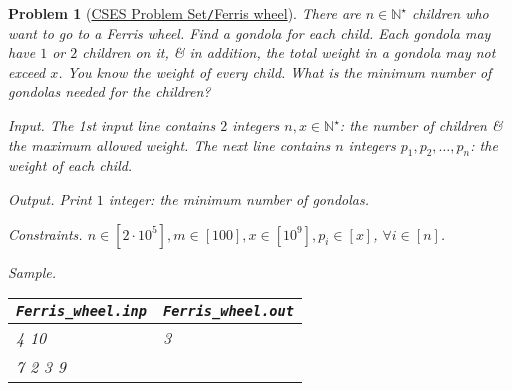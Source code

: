 \documentclass{article}
\newtheorem{problem}{Problem}
\begin{document}
\begin{problem}[\href{https://cses.fi/problemset/task/1090}{CSES Problem Set{\tt/}Ferris wheel}]
    There are $n\in\mathbb{N}^\star$ children who want to go to a Ferris wheel. Find a gondola for each child. Each gondola may have $1$ or $2$ children on it, \& in addition, the total weight in a gondola may not exceed $x$. You know the weight of every child. What is the minimum number of gondolas needed for the children?
    \item {\sf Input.} The 1st input line contains $2$ integers $n,x\in\mathbb{N}^\star$: the number of children \& the maximum allowed weight. The next line contains $n$ integers $p_1,p_2,\ldots,p_n$: the weight of each child.
    \item {\sf Output.} Print $1$ integer: the minimum number of gondolas.
    \item {\sf Constraints.} $n\in[2\cdot10^5],m\in[100],x\in[10^9], p_i\in[x]$, $\forall i\in[n]$.
    \item {\sf Sample.}
    \begin{table}[H]
        \centering
        \begin{tabular}{|l|l|}
            \hline
            \verb|Ferris_wheel.inp| & \verb|Ferris_wheel.out| \\
            \hline
            4 10 & 3 \\
            7 2 3 9 & \\
            \hline
        \end{tabular}
    \end{table}
\end{problem}
\end{document}
